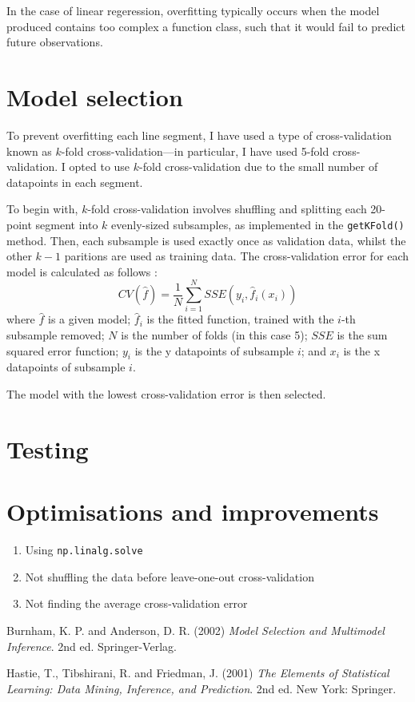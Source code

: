 \documentclass[onecolumn, 12pt, a4paper]{article}
\begin{document}
In the case of linear regeression, overfitting typically occurs
when the model produced contains too complex a function class,
such that it would fail to predict future observations.

\section{Model selection}

To prevent overfitting each line segment, I have used a type of 
cross-validation known as $k$-fold cross-validation---in particular,
I have used 5-fold cross-validation. 
I opted to use $k$-fold cross-validation due to the small number
of datapoints in each segment.

To begin with, $k$-fold cross-validation involves shuffling and 
splitting each 20-point segment into $k$ evenly-sized subsamples,
as implemented in the \texttt{getKFold()} method.
Then, each subsample is used exactly once as validation data,
whilst the other $k - 1$ paritions are used as training data.
The cross-validation error for each model is calculated
as follows \cite{EOSL}:
\[
    CV({\hat{f}}) = \frac{1}{N}\sum_{i = 1}^{N}SSE(y_{i}, \hat{f}_{i}(x_{i}))
\]
where
$\hat{f}$ is a given model;
$\hat{f}_{i}$ is the fitted function, trained with the $i$-th subsample removed;
$N$ is the number of folds (in this case 5);
$SSE$ is the sum squared error function;
$y_{i}$ is the y datapoints of subsample $i$;
and $x_{i}$ is the x datapoints of subsample $i$.

The model with the lowest cross-validation error is then selected.

\section{Testing}

\section{Optimisations and improvements}

\begin{enumerate}
    \item{Using \texttt{np.linalg.solve}}
    \item{Not shuffling the data before leave-one-out cross-validation}
    \item{Not finding the average cross-validation error}
\end{enumerate}

\begin{thebibliography}{9}

    Burnham, K. P. and Anderson, D. R. (2002)
    \textit{Model Selection and Multimodel Inference}.
    2nd ed. Springer-Verlag.

    Hastie, T., Tibshirani, R. and Friedman, J. (2001)
    \textit{The Elements of Statistical Learning: Data Mining, Inference, and Prediction}. 
    2nd ed. New York: Springer.

\end{thebibliography}
    
\end{document}
